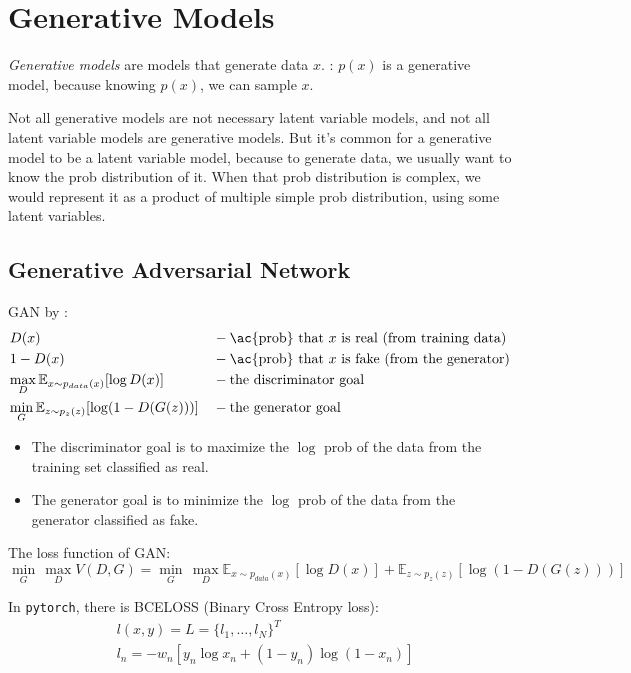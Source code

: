 \section{Generative Models}
\textit{Generative models} are models that generate data $x$. \Eg: $p(x)$ is a generative model, because knowing $p(x)$, we can sample $x$.

\note Not all generative models are not necessary latent variable models, and not all latent variable models are generative models. But it's common for a generative model to be a latent variable model, because to generate data, we usually want to know the \ac{prob} distribution of it. When that \ac{prob} distribution is complex, we would represent it as a product of multiple simple \ac{prob} distribution, using some latent variables.

\subsection{Generative Adversarial Network}
\ac{GAN} by :
\begin{align}
	&D(x) &&-\text{\ac{prob} that $x$ is real (from training data)}\\
	&1-D(x) &&-\text{\ac{prob} that $x$ is fake (from the generator)}\\
	&\underset{D}{\max}\, \mathbb{E}_{x \sim p_{data}(x)} [\log D(x)] &&-\text{the discriminator goal}\\
	&\underset{G}{\min}\, \mathbb{E}_{z \sim p_z(z)} [\log (1-D(G(z)))] &&-\text{the generator goal}
\end{align}
\begin{itemize}
	\item The discriminator goal is to maximize the $\log$ \ac{prob} of the data from the training set classified as real.
	\item The generator goal is to minimize the $\log$ \ac{prob} of the data from the generator classified as fake.
\end{itemize}

The loss function of \ac{GAN}:
\begin{equation}
	\underset{G}{\min}\, \underset{D}{\max} V(D,G) = \underset{G}{\min}\, \underset{D}{\max} \mathbb{E}_{x \sim p_{data}(x)} [\log D(x)] + \mathbb{E}_{z \sim p_z(z)} [\log (1-D(G(z)))]
\end{equation}

In \texttt{pytorch}, there is BCELOSS (Binary Cross Entropy loss):
\begin{align}
	&l(x,y) = L = \{l_1, \dots, l_N\}^T\\
	&l_n = - w_n [y_n \log x_n + (1-y_n) \log(1-x_n)]
\end{align}

